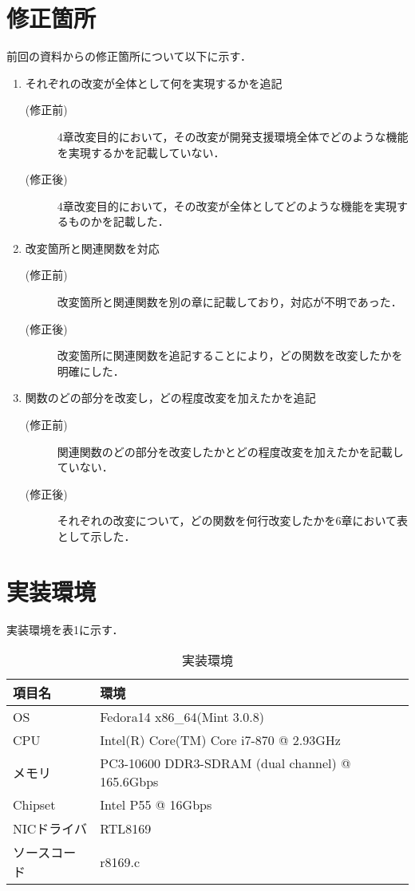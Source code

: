 \documentclass[12pt]{jsarticle}
\begin{document}
\section{修正箇所}
前回の資料からの修正箇所について以下に示す．
\begin{enumerate}
    \item それぞれの改変が全体として何を実現するかを追記
        \begin{description}
            \item [(修正前)]4章改変目的において，その改変が開発支援環境全体でどのような機能を実現するかを記載していない．
            \item [(修正後)]4章改変目的において，その改変が全体としてどのような機能を実現するものかを記載した．
        \end{description}
    \item 改変箇所と関連関数を対応
        \begin{description}
            \item [(修正前)]改変箇所と関連関数を別の章に記載しており，対応が不明であった．
            \item [(修正後)]改変箇所に関連関数を追記することにより，どの関数を改変したかを明確にした．
        \end{description}
    \item 関数のどの部分を改変し，どの程度改変を加えたかを追記
        \begin{description}
            \item [(修正前)]関連関数のどの部分を改変したかとどの程度改変を加えたかを記載していない．
            \item [(修正後)]それぞれの改変について，どの関数を何行改変したかを6章において表として示した．
        \end{description}
\end{enumerate}

\section{実装環境}
実装環境を表1に示す．

\begin{table}[h]
    \caption{実装環境}
    \label{kankyou}
    \begin{center}
        \begin{tabular}{l|l}   \hline \hline 
            項目名      & 環境    \\ \hline
            OS          & Fedora14 x86\_64(Mint 3.0.8)  \\ 
            CPU         & Intel(R) Core(TM) Core i7-870 @ 2.93GHz \\ 
            メモリ      & PC3-10600 DDR3-SDRAM (dual channel) @ 165.6Gbps \\
            Chipset     & Intel P55 @ 16Gbps \\
            NICドライバ & RTL8169    \\ 
            ソースコード& r8169.c \\ \hline
        \end{tabular}
    \end{center}
\end{table}
\end{document}
